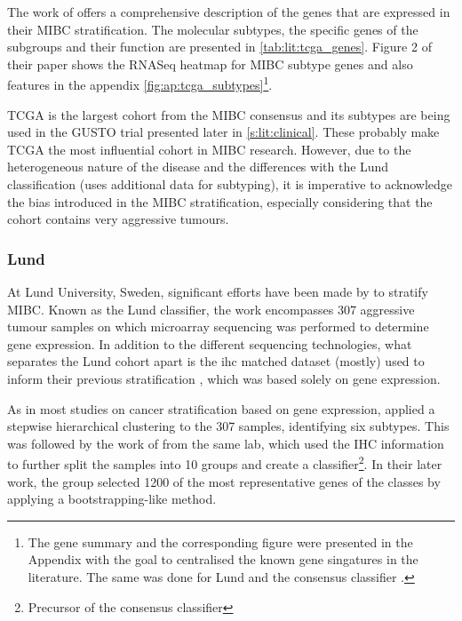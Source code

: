 The work of \citet{Robertson2017-mg} offers a comprehensive description of the genes that are expressed in their MIBC stratification. The molecular subtypes, the specific genes of the subgroups and their function are presented in \cref{tab:lit:tcga_genes}. Figure 2 of their paper shows the RNASeq heatmap for MIBC subtype genes and also features in the appendix \cref{fig:ap:tcga_subtypes}\footnote{The gene summary and the corresponding figure were presented in the Appendix with the goal to centralised the known gene singatures in the literature. The same was done for Lund and the consensus classifier \citep{Marzouka2018-ge,Kamoun2020-tj}.}.


TCGA is the largest cohort from the MIBC consensus and its subtypes are being used in the GUSTO trial presented later in \cref{s:lit:clinical}. These probably make TCGA the most influential cohort in MIBC research. However, due to the heterogeneous nature of the disease and the differences with the Lund classification (uses additional data for subtyping), it is imperative to acknowledge the bias introduced in the MIBC stratification, especially considering that the cohort contains very aggressive tumours.

\subsubsection*{Lund} \label{s:lit:lund_mibc}

At Lund University, Sweden, significant efforts have been made by \citep{Sjodahl2017-xr, Marzouka2018-ge} to stratify MIBC. Known as the Lund classifier, the work encompasses 307 aggressive tumour samples on which microarray sequencing was performed to determine gene expression. In addition to the different sequencing technologies, what separates the Lund cohort apart is the \acrfull{ihc} matched dataset (mostly) used to inform their previous stratification \citet{Sjodahl2017-xr}, which was based solely on gene expression.

As in most studies on cancer stratification based on gene expression, \citet{Sjodahl2017-xr} applied a stepwise hierarchical clustering to the 307 samples, identifying six subtypes. This was followed by the work of \citet{Marzouka2018-ge} from the same lab, which used the IHC information to further split the samples into 10 groups and create a classifier\footnote{Precursor of the consensus classifier}. In their later work, the group selected 1200 of the most representative genes of the classes by applying a bootstrapping-like method.

